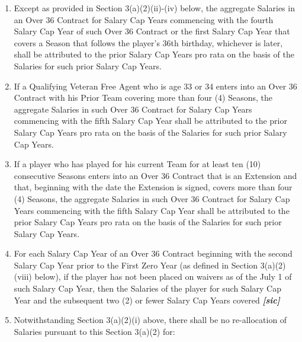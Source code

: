 \documentclass[
]{book}
\providecommand{\tightlist}{%
  \setlength{\itemsep}{0pt}\setlength{\parskip}{0pt}}
\begin{document}
\begin{enumerate}
\begin{enumerate}
    \begin{enumerate}
    \def\labelenumiii{(\roman{enumiii})}
    \tightlist
    \item
      Except as provided in Section 3(a)(2)(ii)-(iv) below, the aggregate Salaries in an Over 36 Contract for Salary Cap Years commencing with the fourth Salary Cap Year of such Over 36 Contract or the first Salary Cap Year that covers a Season that follows the player's 36th birthday, whichever is later, shall be attributed to the prior Salary Cap Years pro rata on the basis of the Salaries for such prior Salary Cap Years.
    \item
      If a Qualifying Veteran Free Agent who is age 33 or 34 enters into an Over 36 Contract with his Prior Team covering more than four (4) Seasons, the aggregate Salaries in such Over 36 Contract for Salary Cap Years commencing with the fifth Salary Cap Year shall be attributed to the prior Salary Cap Years pro rata on the basis of the Salaries for such prior Salary Cap Years.
    \item
      If a player who has played for his current Team for at least ten (10) consecutive Seasons enters into an Over 36 Contract that is an Extension and that, beginning with the date the Extension is signed, covers more than four (4) Seasons, the aggregate Salaries in such Over 36 Contract for Salary Cap Years commencing with the fifth Salary Cap Year shall be attributed to the prior Salary Cap Years pro rata on the basis of the Salaries for such prior Salary Cap Years.
    \item
      For each Salary Cap Year of an Over 36 Contract beginning with the second Salary Cap Year prior to the First Zero Year (as defined in Section 3(a)(2)(viii) below), if the player has not been placed on waivers as of the July 1 of such Salary Cap Year, then the Salaries of the player for such Salary Cap Year and the subsequent two (2) or fewer Salary Cap Years covered \textbf{\emph{{[}sic{]}}}
    \item
      Notwithstanding Section 3(a)(2)(i) above, there shall be no re-allocation of Salaries pursuant to this Section 3(a)(2) for:


\end{enumerate}
\end{enumerate}
\end{enumerate}
\end{document}
